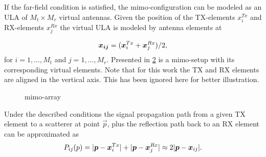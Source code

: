 \begin{figure}[h!]
	\centering
	\begin{minipage}{.5\textwidth}
		\centering
		
		\label{fig:ula}
	\end{minipage}%
	\begin{minipage}{.5\textwidth}
		\centering
		
		\label{fig:uca}
	\end{minipage}
\end{figure}

If the far-field condition is satisfied, the \Ac{mimo}-configuration can be modeled as an ULA of  $M_t\times M_r$ virtual antennas. Given the position of the TX-elements $x_i^{Tx}$ and RX-elements $x_j^{Rx}$ the virtual ULA is modeled by antenna elements at 

\begin{equation}
\vec{x_{ij}} = (\vec{x}_i^{Tx}+\vec{x}_j^{Rx})/2\\,
\end{equation}
for $i = 1,...,M_t$ and $j = 1,...,M_r$. Presented in \cref{fig:mimo_array} is a \Ac{mimo}-setup with its corresponding virtual elements. Note that for this work the TX and RX elements are aligned in the vertical axis. This has been ignored here for better illustration. 

\begin{figure}[h]
	\centering
	
	\caption{\ac{mimo}-array}
		\label{fig:mimo_array}
\end{figure} 
 
 Under the described conditions the signal propagation path from a given TX element to a scatterer at point $\vec{p}$, plus the reflection path back to an RX element can be approximated as
 \begin{equation}
 	P_{ij}(p) = |\vec{p}-\vec{x}_i^{Tx}| + |\vec{p}-\vec{x}_j^{Rx}| \approx 2|\vec{p}-\vec{x}_{ij}| \\.
 \end{equation}